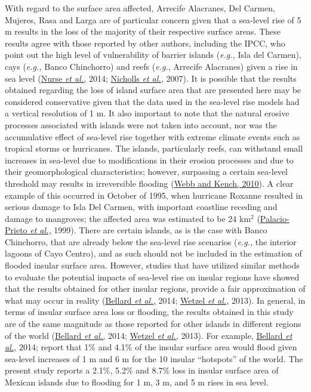 \documentclass{article} %
\begin{document}
With regard to the surface area affected, Arrecife Alacranes, Del Carmen, Mujeres,
Rasa and Larga are of particular concern given that a sea-level rise of 5 m results in
the loss of the majority of their respective surface areas. These results agree with
those reported by other authors, including the IPCC, who point out the high level of
vulnerability of barrier islands (\textit{e.g.,} Isla del Carmen), cays (\textit{e.g.,} Banco Chinchorro)
and reefs (\textit{e.g.}, Arrecife Alacranes) given a rise in sea level (\hyperlink{nurse}{Nurse \textit{et al.,}} 2014; \hyperlink{nicholls}{Nicholls \textit{et al.,}} 2007). It is possible that the results obtained regarding the loss of
island surface area that are presented here may be considered conservative given
that the data used in the sea-level rise models had a vertical resolution of 1 m. It
also important to note that the natural erosive processes associated with islands were
not taken into account, nor was the accumulative effect of sea-level rise together
with extreme climate events such as tropical storms or hurricanes. The islands,
particularly reefs, can withstand small increases in sea-level due to modifications in
their erosion processes and due to their geomorphological characteristics; however,
surpassing a certain sea-level threshold may results in irreversible flooding (\hyperlink{webb}{Webb
and Kench, 2010}). A clear example of this occurred in October of 1995, when
hurricane Roxanne resulted in serious damage to Isla Del Carmen, with important
coastline receding and damage to mangroves; the affected area was estimated to be
24 km$^{2}$
(\hyperlink{palacio}{Palacio-Prieto \textit{et al.,}} 1999). There are certain islands, as is the case with
Banco Chinchorro, that are already below the sea-level rise scenarios (\textit{e.g.,} the
interior lagoons of Cayo Centro), and as such should not be included in the estimation
of flooded insular surface area. However, studies that have utilized similar methods
to evaluate the potential impacts of sea-level rise on insular regions have showed
that the results obtained for other insular regions, provide a fair approximation of
what may occur in reality (\hyperlink{bellard}{Bellard \textit{et al.,}} 2014; \hyperlink{bellard}{Wetzel \textit{et al.,}} 2013). In general,
in terms of insular surface area loss or flooding, the results obtained in this study are
of the same magnitude as those reported for other islands in different regions of the
world (\hyperlink{bellard}{Bellard \textit{et al.,}} 2014; \hyperlink{bellard}{Wetzel \textit{et al.,}} 2013). For example, \hyperlink{bellard}{Bellard \textit{et al.,}} 2014;
report that 1\% and 4.1\% of the insular surface area would flood given sea-level
increases of 1 m and 6 m for the 10 insular “hotspots” of the world. The present
study reports a 2.1\%, 5.2\% and 8.7\% loss in insular surface area of Mexican islands
due to flooding for 1 m, 3 m, and 5 m rises in sea level.\\
\end{document}
